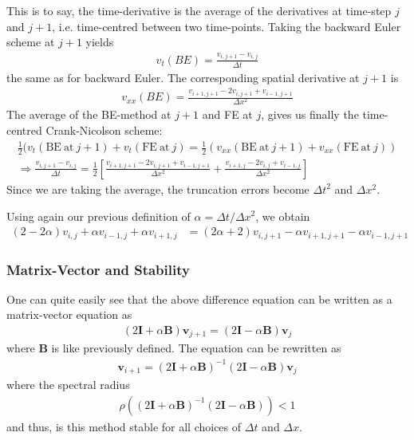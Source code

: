 \documentclass[twoside, 11pt]{article}
\begin{document}
				This is to say, the time-derivative is the average of the derivatives at time-step $j$ and $j+1$, i.e. time-centred between two time-points. Taking the backward Euler scheme at $j+1$ yields
				\begin{align*}
					v_t (BE) = \frac{v_{i,j+1} - v_{i,j}}{\Delta t}
				\end{align*}
				the same as for backward Euler. The corresponding spatial derivative at $j+1$ is
				\begin{align*}
					v_{xx} (BE) = \frac{v_{i+1,j+1} - 2v_{i,j+1}+v_{i-1,j+1}}{\Delta x^2}
				\end{align*}
				The average of the BE-method at $j+1$ and FE at $j$, gives us finally the time-centred Crank-Nicolson scheme:
				\begin{align}
					\frac{1}{2}( v_t (\mathrm{BE~at~}j+1) + v_t(\mathrm{FE~at~}j) =\frac{1}{2}( v_{xx}(\mathrm{BE~at~}j+1) + v_{xx}(\mathrm{FE~at~}j)) \nonumber \\
					\Rightarrow\frac{v_{i,j+1}-v_{i,j}}{\Delta t} = \frac{1}{2}\left[\frac{v_{i+1,j+1} - 2v_{i,j+1} + v_{i-1,j+1}}{\Delta x^2} + \frac{v_{i+1,j} - 2v_{i,j} + v_{i-1,j}}{\Delta x^2}\right]
				\end{align}
				Since we are taking the average, the truncation errors become $\Delta t^2$ and $\Delta x^2$.
				
		Using again our previous definition of $\alpha = \Delta t / \Delta x^2$, we obtain
		\begin{align}
			(2-2\alpha)v_{i,j} + \alpha v_{i-1,j} + \alpha v_{i+1,j} &= (2\alpha + 2)v_{i,j+1} - \alpha v_{i+1,j+1} - \alpha v_{i-1,j+1}
		\end{align}
	
		\subsubsection{Matrix-Vector and Stability}
			One can quite easily see that the above difference equation can be written as a matrix-vector equation as
			\begin{align}
				(2\mathbf{I} + \alpha \mathbf{B})\mathbf{v}_{j+1} = (2\mathbf{I} - \alpha\mathbf{B})\mathbf{v}_j \label{eq: CN scheme matrix vector}
			\end{align}
			where $\mathbf{B}$ is like previously defined. The equation can be rewritten as
			\begin{align*}
				\mathbf{v}_{i+1} = (2\mathbf{I} + \alpha \mathbf{B})^{-1}(2\mathbf{I} - \alpha \mathbf{B})\mathbf{v}_j
			\end{align*}
			where the spectral radius
			\begin{align*}
				\rho((2\mathbf{I} + \alpha \mathbf{B})^{-1}(2\mathbf{I} - \alpha \mathbf{B})) < 1
			\end{align*}
			and thus, is this method stable for all choices of $\Delta t$ and $\Delta x$.
			
\end{document}
